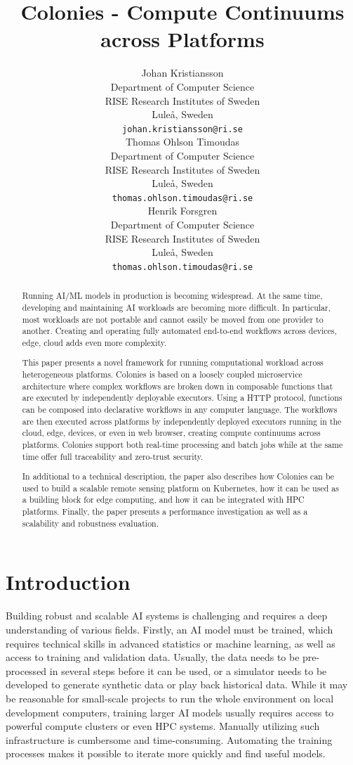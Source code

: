 \documentclass{article}
\title{Colonies - Compute Continuums across Platforms}
\author{{\hspace{1mm}Johan Kristiansson} \\
	Department of Computer Science \\
	RISE Research Institutes of Sweden \\
	Luleå, Sweden \\
	\texttt{johan.kristiansson@ri.se} \\
	\And
	{\hspace{1mm}Thomas Ohlson Timoudas} \\
	Department of Computer Science \\
	RISE Research Institutes of Sweden \\
	Luleå, Sweden \\
	\texttt{thomas.ohlson.timoudas@ri.se} \\
	\And
	{\hspace{1mm}Henrik Forsgren} \\
	Department of Computer Science \\
	RISE Research Institutes of Sweden \\
	Luleå, Sweden \\
	\texttt{thomas.ohlson.timoudas@ri.se} \\
}
\begin{document}
\maketitle

\begin{abstract}
Running AI/ML models in production is becoming widespread. At the same time, developing and maintaining AI workloads are becoming more difficult. In particular, most workloads are not portable and cannot easily be moved from one provider to another. Creating and operating fully automated end-to-end workflows across devices, edge, cloud adds even more complexity.

This paper presents a novel framework for running computational workload across heterogeneous platforms. Colonies is based on a loosely coupled microservice architecture where complex workflows are broken down in composable functions that are executed by independently deployable executors. Using a HTTP protocol, functions can be composed into declarative workflows in any computer language. The workflows are then executed across platforms by independently deployed executors running in the cloud, edge, devices, or even in web browser, creating compute continuums across platforms. Colonies support both real-time processing and batch jobs while at the same time offer full traceability and zero-trust security.

In additional to a technical description, the paper also describes how Colonies can be used to build a scalable remote sensing platform on Kubernetes, how it can be used as a building block for edge computing, and how it can be integrated with HPC platforms. Finally, the paper presents a performance investigation as well as a scalability and robustness evaluation. 
\end{abstract}


\section{Introduction}
Building robust and scalable AI systems is challenging and requires a deep understanding of various fields. Firstly, an AI model must be trained, which requires technical skills in advanced statistics or machine learning, as well as access to training and validation data. Usually, the data needs to be pre-processed in several steps before it can be used, or a simulator needs to be developed to generate synthetic data or play back historical data. While it may be reasonable for small-scale projects to run the whole environment on local development computers, training larger AI models usually requires access to powerful compute clusters or even HPC systems. Manually utilizing such infrastructure is cumbersome and time-consuming. Automating the training processes makes it possible to iterate more quickly and find useful models.
\end{document}
